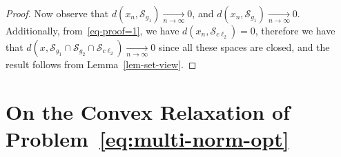 \begin{proof}
Now observe that $d(x_n,\mathcal{S}_{g_1})\xrightarrow[n\to \infty]{} 0 $, and $d(x_n,\mathcal{S}_{g_1})\xrightarrow[n\to \infty]{} 0 $. Additionally, from~\eqref{eq-proof=1}, we have $d(x_n,\mathcal{S}_{c\ell_2})=0$, therefore we have that $d(x,\mathcal{S}_{g_1}\cap \mathcal{S}_{g_2}\cap\mathcal{S}_{c\ell_2})\xrightarrow[n\to\infty]{}0$ since all these spaces are closed, and the result follows from  Lemma~\ref{lem-set-view}.  

\end{proof}


\section{On the Convex Relaxation of Problem~\eqref{eq:multi-norm-opt}}
\label{sec:convex-relaxation}







